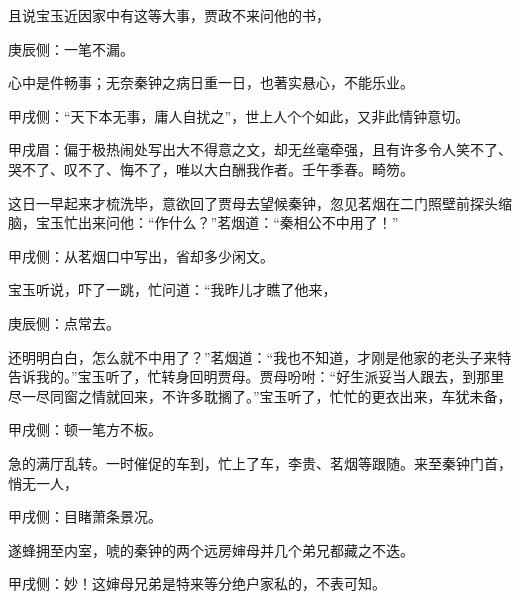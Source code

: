 \begin{parag}
    且说宝玉近因家中有这等大事，贾政不来问他的书，\begin{note}庚辰侧：一笔不漏。\end{note}心中是件畅事；无奈秦钟之病日重一日，也著实悬心，不能乐业。\begin{note}甲戌侧：“天下本无事，庸人自扰之”，世上人个个如此，又非此情钟意切。\end{note}\begin{note}甲戌眉：偏于极热闹处写出大不得意之文，却无丝毫牵强，且有许多令人笑不了、哭不了、叹不了、悔不了，唯以大白酬我作者。壬午季春。畸笏。\end{note}这日一早起来才梳洗毕，意欲回了贾母去望候秦钟，忽见茗烟在二门照壁前探头缩脑，宝玉忙出来问他：“作什么？”茗烟道：“秦相公不中用了！”\begin{note}甲戌侧：从茗烟口中写出，省却多少闲文。\end{note}宝玉听说，吓了一跳，忙问道：“我昨儿才瞧了他来，\begin{note}庚辰侧：点常去。\end{note}还明明白白，怎么就不中用了？”茗烟道：“我也不知道，才刚是他家的老头子来特告诉我的。”宝玉听了，忙转身回明贾母。贾母吩咐：“好生派妥当人跟去，到那里尽一尽同窗之情就回来，不许多耽搁了。”宝玉听了，忙忙的更衣出来，车犹未备，\begin{note}甲戌侧：顿一笔方不板。\end{note}急的满厅乱转。一时催促的车到，忙上了车，李贵、茗烟等跟随。来至秦钟门首，悄无一人，\begin{note}甲戌侧：目睹萧条景况。\end{note}遂蜂拥至内室，唬的秦钟的两个远房婶母并几个弟兄都藏之不迭。\begin{note}甲戌侧：妙！这婶母兄弟是特来等分绝户家私的，不表可知。\end{note}
\end{parag}


